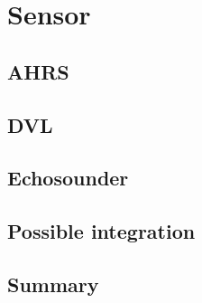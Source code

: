 \chapter{Sensor}
\label{chap:third}
\ifpdf
    \graphicspath{{Chapter3/Figures/PNG/}{Chapter3/Figures/PDF/}{Chapter3/Figures/}{Chapter3/Figures/EPS/}}
\else
    \graphicspath{{Chapter3/Figures/EPS/}{Chapter3/Figures/}}
\fi


\section{AHRS}
\section{DVL}
\section{Echosounder}
\section{Possible integration}
\section{Summary}